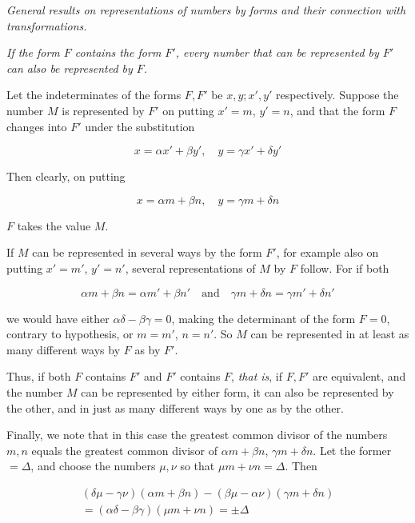 \begin{center}\emph{General results on representations of numbers by forms and their connection with transformations.}\end{center}


\emph{If the form $F$ contains the form $F'$, every number that can be represented by $F'$ can also be represented by $F$.}

Let the indeterminates of the forms $F,F'$ be $x,y;x',y'$ respectively. Suppose the number $M$ is represented by $F'$ on putting $x'=m$, $y'=n$, and that the form $F$ changes into $F'$ under the substitution

\[
x=\alpha x'+\beta y',\quad y=\gamma x'+\delta y'
\]


Then clearly, on putting

\[
x=\alpha m+\beta n,\quad y=\gamma m+\delta n
\]

$F$ takes the value $M$.

If $M$ can be represented in several ways by the form $F'$, for example also on putting $x'=m'$, $y'=n'$, several representations of $M$ by $F$ follow. For if both

\[
\alpha m+\beta n=\alpha m'+\beta n'\quad\text{and}\quad\gamma m+\delta n=\gamma m'+\delta n'
\]

we would have either $\alpha\delta-\beta\gamma=0$, making the determinant of the form $F=0$, contrary to hypothesis, or $m=m'$, $n=n'$. So $M$ can be represented in at least as many different ways by $F$ as by $F'$.

Thus, if both $F$ contains $F'$ and $F'$ contains $F$, \emph{that is}, if $F,F'$ are equivalent, and the number $M$ can be represented by either form, it can also be represented by the other, and in just as many different ways by one as by the other.

Finally, we note that in this case the greatest common divisor of the numbers $m,n$ equals the greatest common divisor of $\alpha m+\beta n$, $\gamma m+\delta n$. Let the former $=\Delta$, and choose the numbers $\mu,\nu$ so that $\mu m+\nu n=\Delta$. Then

\[
\begin{gathered}(\delta\mu-\gamma\nu)(\alpha m+\beta n)-(\beta\mu-\alpha\nu)(\gamma m+\delta n)\\=(\alpha\delta-\beta\gamma)(\mu m+\nu n)=\pm\Delta\end{gathered}
\]

